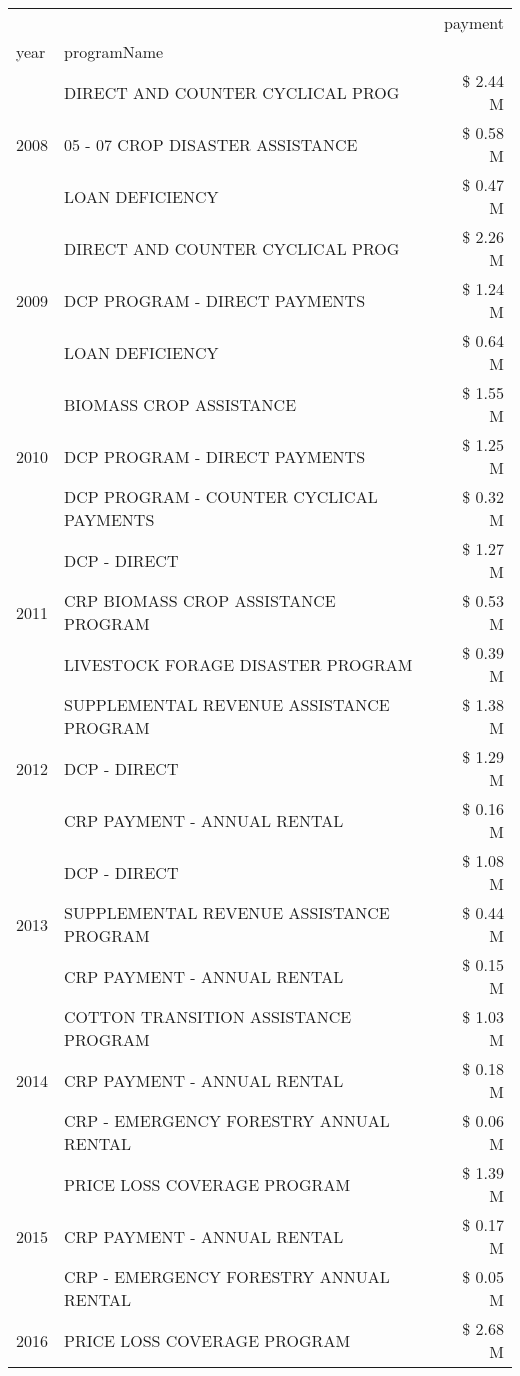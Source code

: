\begin{tabular}{llr}
\toprule
 &  & payment \\
year & programName &  \\
\midrule
\multirow[t]{3}{*}{2008} & DIRECT AND COUNTER CYCLICAL PROG & \$ 2.44 M \\
 & 05 - 07 CROP DISASTER ASSISTANCE & \$ 0.58 M \\
 & LOAN DEFICIENCY & \$ 0.47 M \\
\cline{1-3}
\multirow[t]{3}{*}{2009} & DIRECT AND COUNTER CYCLICAL PROG & \$ 2.26 M \\
 & DCP PROGRAM - DIRECT PAYMENTS & \$ 1.24 M \\
 & LOAN DEFICIENCY & \$ 0.64 M \\
\cline{1-3}
\multirow[t]{3}{*}{2010} & BIOMASS CROP ASSISTANCE & \$ 1.55 M \\
 & DCP PROGRAM - DIRECT PAYMENTS & \$ 1.25 M \\
 & DCP PROGRAM - COUNTER CYCLICAL PAYMENTS & \$ 0.32 M \\
\cline{1-3}
\multirow[t]{3}{*}{2011} & DCP - DIRECT & \$ 1.27 M \\
 & CRP BIOMASS CROP ASSISTANCE PROGRAM & \$ 0.53 M \\
 & LIVESTOCK FORAGE DISASTER PROGRAM & \$ 0.39 M \\
\cline{1-3}
\multirow[t]{3}{*}{2012} & SUPPLEMENTAL REVENUE ASSISTANCE PROGRAM & \$ 1.38 M \\
 & DCP - DIRECT & \$ 1.29 M \\
 & CRP PAYMENT - ANNUAL RENTAL & \$ 0.16 M \\
\cline{1-3}
\multirow[t]{3}{*}{2013} & DCP - DIRECT & \$ 1.08 M \\
 & SUPPLEMENTAL REVENUE ASSISTANCE PROGRAM & \$ 0.44 M \\
 & CRP PAYMENT - ANNUAL RENTAL & \$ 0.15 M \\
\cline{1-3}
\multirow[t]{3}{*}{2014} & COTTON TRANSITION ASSISTANCE PROGRAM & \$ 1.03 M \\
 & CRP PAYMENT - ANNUAL RENTAL & \$ 0.18 M \\
 & CRP - EMERGENCY FORESTRY ANNUAL RENTAL & \$ 0.06 M \\
\cline{1-3}
\multirow[t]{3}{*}{2015} & PRICE LOSS COVERAGE PROGRAM & \$ 1.39 M \\
 & CRP PAYMENT - ANNUAL RENTAL & \$ 0.17 M \\
 & CRP - EMERGENCY FORESTRY ANNUAL RENTAL & \$ 0.05 M \\
\cline{1-3}
\multirow[t]{3}{*}{2016} & PRICE LOSS COVERAGE PROGRAM                   & \$ 2.68 M \\

\end{tabular}
